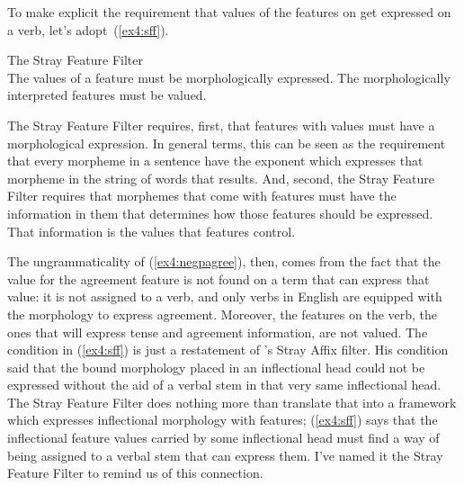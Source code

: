 To make explicit the requirement that values of the features on  get expressed on a verb, let's adopt~(\ref{ex4:sff}).
\begin{exe}
\ex \label{ex4:sff} The Stray Feature Filter\\
The values of a feature must be morphologically expressed. The morphologically interpreted features must be valued.
\end{exe}
The Stray Feature Filter requires, first, that features with values must have a morphological expression. In general terms, this can be seen as the requirement that every morpheme in a sentence have the exponent which expresses that morpheme in the string of words that results. And, second, the Stray Feature Filter requires that morphemes that come with features must have the information in them that determines how those features should be expressed. That information is the values that features control. 

The ungrammaticality of (\ref{ex4:negpagree}), then, comes from the fact that the value for the agreement feature is not found on a term that can express that value: it is not assigned to a verb, and only verbs in English are equipped with the morphology to express agreement. Moreover, the features on the verb, the ones that will express tense and agreement information, are not valued. The condition in (\ref{ex4:sff}) is just a restatement of \citet{Lasnik:1981}'s Stray Affix filter. His condition said that the bound morphology placed in an inflectional head could not be expressed without the aid of a verbal stem in that very same inflectional head. The Stray Feature Filter does nothing more than translate that into a framework which expresses inflectional morphology with features; (\ref{ex4:sff}) says that the inflectional feature values carried by some inflectional head must find a way of being assigned to a verbal stem that can express them. I've named it the Stray Feature Filter to remind us of this connection.

